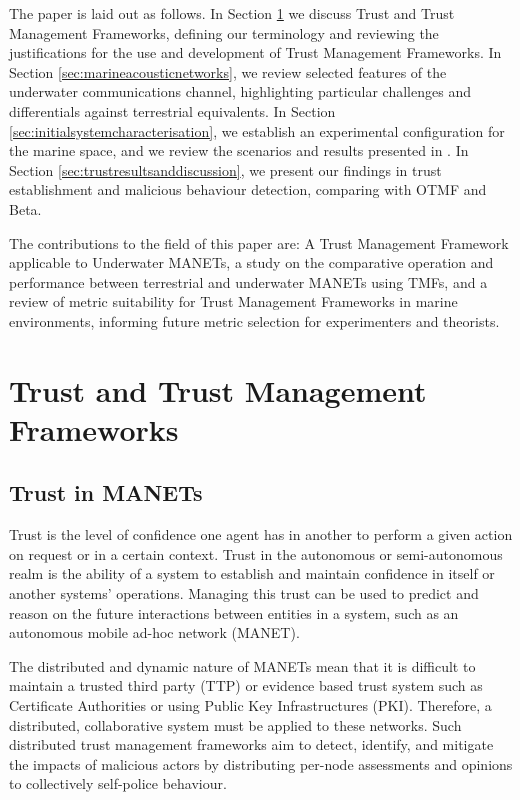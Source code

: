 \documentclass[runningheads,a4paper]{llncs}
\begin{document}
The paper is laid out as follows.
In Section \ref{sec:trustandtmfs} we discuss Trust and Trust Management Frameworks, defining our terminology and reviewing the justifications for the use and development of Trust Management Frameworks.
In Section \ref{sec:marineacousticnetworks}, we review selected features of the underwater communications channel, highlighting particular challenges and differentials against terrestrial equivalents.
In Section \ref{sec:initialsystemcharacterisation}, we establish an experimental configuration for the marine space, and we review the scenarios and results presented in \cite{Guo11}.
In Section \ref{sec:trustresultsanddiscussion}, we present our findings in trust establishment and malicious behaviour detection, comparing with OTMF and Beta.

The contributions to the field of this paper are: A Trust Management Framework applicable to Underwater MANETs, a study on the comparative operation and performance between terrestrial and underwater MANETs using TMFs, and a review of metric suitability for Trust Management Frameworks in marine environments, informing future metric selection for experimenters and theorists.

\section{Trust and Trust Management Frameworks}\label{sec:trustandtmfs}

\subsection{Trust in MANETs}\label{sec:trustinmanets}

Trust is the level of confidence one agent has in another to perform a given action on request or in a certain context. Trust in the autonomous or semi-autonomous realm is the ability of a system to establish and maintain confidence in itself or another systems' operations. 
Managing this trust can be used to predict and reason on the future interactions between entities in a system, such as an autonomous mobile ad-hoc network (MANET).

The distributed and dynamic nature of MANETs mean that it is difficult to maintain a trusted third party (TTP) or evidence based trust system such as Certificate Authorities or using Public Key Infrastructures (PKI).
Therefore, a distributed, collaborative system must be applied to these networks.
Such distributed trust management frameworks aim to detect, identify, and mitigate the impacts of malicious actors by distributing per-node assessments and opinions to collectively self-police behaviour.
\end{document}
